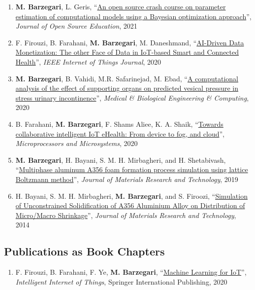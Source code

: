 \documentclass{cv}
\begin{document}
\begin{enumerate}[itemsep=-0.2ex]
\item
\textbf{M. Barzegari}, L. Geris, ``\href{https://doi.org/10.21105/jose.00089}{An open source crash course on parameter estimation of computational models using a Bayesian optimization approach}'', \textit{Journal of Open Source Education}, 2021
\item
F. Firouzi, B. Farahani, \textbf{M. Barzegari}, M. Daneshmand, ``\href{https://doi.org/10.1109/JIOT.2020.3027971}{AI-Driven Data Monetization: The other Face of Data in IoT-based Smart and Connected Health}'', \textit{IEEE Internet of Things Journal}, 2020
\item
\textbf{M. Barzegari}, B. Vahidi, M.R. Safarinejad, M. Ebad, ``\href{https://doi.org/10.1007/s11517-020-02148-2}{A computational analysis of the effect of supporting organs on predicted vesical pressure in stress urinary incontinence}'', \textit{Medical \& Biological Engineering \& Computing}, 2020
\item
B. Farahani, \textbf{M. Barzegari}, F. Shams Aliee, K. A. Shaik, ``\href{https://doi.org/10.1016/j.micpro.2019.102938}{Towards collaborative intelligent IoT eHealth: From device to fog, and cloud}'', \textit{Microprocessors and Microsystems}, 2020
\item
\textbf{M. Barzegari}, H. Bayani, S. M. H. Mirbagheri, and H. Shetabivash, ``\href{https://doi.org/10.1016/j.jmrt.2018.03.010}{Multiphase aluminum A356 foam formation process simulation using lattice Boltzmann method}'', \textit{Journal of Materials Research and Technology}, 2019
\item
H. Bayani, S. M. H. Mirbagheri, \textbf{M. Barzegari}, and S. Firoozi, ``\href{http://www.sciencedirect.com/science/article/pii/S2238785413001129}{Simulation of Unconstrained Solidification of A356 Aluminium Alloy on Distribution of Micro/Macro Shrinkage}'', \textit{Journal of Materials Research and Technology}, 2014
\end{enumerate}

\subsection{Publications as Book Chapters}

\begin{enumerate}[itemsep=-0.2ex]
\item
F. Firouzi, B. Farahani, F. Ye, \textbf{M. Barzegari}, ``\href{https://link.springer.com/chapter/10.1007\%2F978-3-030-30367-9_5}{Machine Learning for IoT}'', \textit{Intelligent Internet of Things}, Springer International Publishing, 2020
\end{enumerate}
\end{document}
